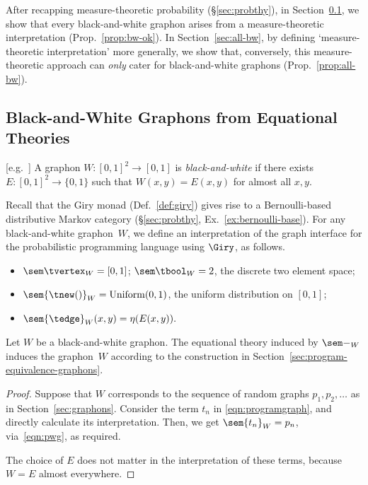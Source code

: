 After recapping measure-theoretic probability (\S\ref{sec:probthy}), in Section~\ref{sec:bw-theory}, we show that every
black-and-white graphon arises from a measure-theoretic
interpretation (Prop.~\ref{prop:bw-ok}). In Section~\ref{sec:all-bw}, by defining `measure-theoretic interpretation' more
generally, we show that, conversely, this measure-theoretic approach can \emph{only} cater
for black-and-white graphons (Prop.~\ref{prop:all-bw}).


\subsection{Black-and-White Graphons from Equational Theories}\label{sec:bw-theory}
\begin{definition}\label{def:bw}[e.g.~\cite{janson}]
  A graphon $W:[0,1]^2\to [0,1]$ is \emph{black-and-white} if there exists
$E:[0,1]^2\to \{0,1\}$ such that 
$W(x,y)=E(x,y)$ for almost all $x,y$.
\end{definition}
Recall that the Giry monad (Def.~\ref{def:giry}) gives rise to a Bernoulli-based distributive Markov category  (\S\ref{sec:probthy}, Ex.~\ref{ex:bernoulli-base}).
For any black-and-white graphon~$W$, we define an interpretation of
the graph interface for the probabilistic programming language
using $\Giry$, as follows.
\begin{itemize}
\item $\sem\tvertex_W = [0,1]$; $\sem \tbool_W= 2$, the discrete two element space;
\item $\sem{\tnew()}_W = \mathrm{Uniform}(0,1)$, the uniform distribution on $[0,1]$;
\item $\sem{\tedge}_W(x,y)=\eta(E(x,y)).
        $
\end{itemize}
\begin{proposition}\label{prop:bw-ok}
  Let $W$ be a black-and-white graphon. The equational theory induced by $\sem-_W$ induces the graphon~$W$ according to the construction in Section~\ref{sec:program-equivalence-graphons}.
\end{proposition}
\begin{proof}
  

Suppose that $W$ corresponds to the sequence of random graphs $p_1,p_2,\dots $ as in Section~\ref{sec:graphons}. Consider the term $t_n$ in \eqref{eqn:programgraph}, and directly calculate its interpretation. Then, we get $\sem {t_n}_W=p_n$, via~\eqref{eqn:pwg}, as required. 

  The choice of $E$ does not matter in the interpretation of these terms, because $W=E$ almost everywhere.
\end{proof}
